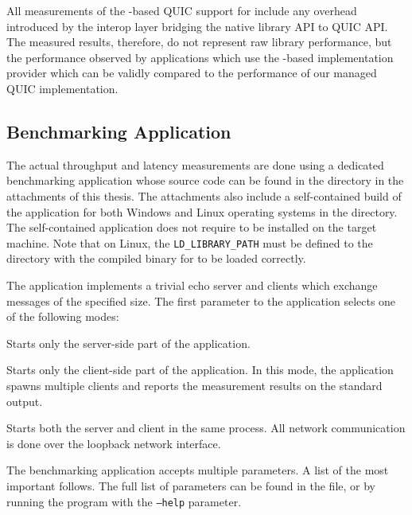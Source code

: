 All measurements of the \libmsquic{}-based QUIC support for \dotnet{} include any overhead
introduced by the interop layer bridging the native library API to \dotnet{} QUIC API\@. The
measured results, therefore, do not represent raw \libmsquic{} library performance, but the
performance observed by \dotnet{} applications which use the \libmsquic{}-based implementation
provider which can be validly compared to the performance of our managed QUIC implementation.

\subsection{Benchmarking Application}\label{sec:04-benchmark-app}

The actual throughput and latency measurements are done using a dedicated benchmarking \dotnet{}
application whose source code can be found in the
 directory in the attachments of this thesis.
The attachments also include a self-contained build of the application for both Windows and Linux
operating systems in the  directory. The self-contained
application does not require \dotnet{} to be installed on the target machine. Note that on Linux,
the \texttt{LD_LIBRARY_PATH} must be defined to the directory with the compiled binary for
\libmsquic{} to be loaded correctly.

The application implements a trivial echo server and clients which exchange messages of the
specified size. The first parameter to the application selects one of the following modes:

\begin{description}

   Starts only the server-side part of the application.

   Starts only the client-side part of the application. In this mode, the
application spawns multiple clients and reports the measurement results on the standard output.

   Starts both the server and client in the same process. All network
communication is done over the loopback network interface.

\end{description}

The benchmarking application accepts multiple parameters. A list of the most important follows. The
full list of parameters can be found in the  file, or by running the program
with the \texttt{--help} parameter.

